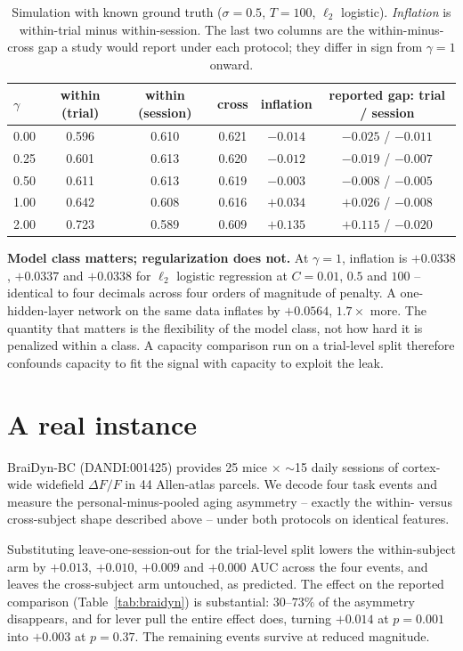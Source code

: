 \documentclass{article}
\newcommand{\auc}{\mathrm{AUC}}
\begin{document}
\begin{table}[t]\centering
\caption{Simulation with known ground truth ($\sigma = 0.5$, $T = 100$, $\ell_2$ logistic).
\emph{Inflation} is within-trial minus within-session. The last two columns are the within-minus-cross
gap a study would report under each protocol; they differ in sign from $\gamma = 1$ onward.}
\label{tab:sim}
\begin{tabular}{lccccc}
\toprule
$\gamma$ & within (trial) & within (session) & cross & inflation & reported gap: trial / session \\
\midrule
0.00 & 0.596 & 0.610 & 0.621 & $-0.014$ & $-0.025$ / $-0.011$ \\
0.25 & 0.601 & 0.613 & 0.620 & $-0.012$ & $-0.019$ / $-0.007$ \\
0.50 & 0.611 & 0.613 & 0.619 & $-0.003$ & $-0.008$ / $-0.005$ \\
1.00 & 0.642 & 0.608 & 0.616 & $\mathbf{+0.034}$ & $\mathbf{+0.026}$ / $\mathbf{-0.008}$ \\
2.00 & 0.723 & 0.589 & 0.609 & $\mathbf{+0.135}$ & $\mathbf{+0.115}$ / $\mathbf{-0.020}$ \\
\bottomrule
\end{tabular}
\end{table}

\textbf{Model class matters; regularization does not.} At $\gamma = 1$, inflation is $+0.0338$,
$+0.0337$ and $+0.0338$ for $\ell_2$ logistic regression at $C = 0.01$, $0.5$ and $100$ -- identical
to four decimals across four orders of magnitude of penalty. A one-hidden-layer network on the same
data inflates by $+0.0564$, $1.7\times$ more. The quantity that matters is the flexibility of the
model class, not how hard it is penalized within a class. A capacity comparison run on a trial-level
split therefore confounds capacity to fit the signal with capacity to exploit the leak.

\section{A real instance}
\label{sec:braidyn}
BraiDyn-BC \citep{kondo2025} (DANDI:001425) provides 25 mice $\times$ $\sim$15 daily sessions of
cortex-wide widefield $\Delta F/F$ in 44 Allen-atlas parcels. We decode four task events and measure
the personal-minus-pooled aging asymmetry -- exactly the within- versus cross-subject shape described
above -- under both protocols on identical features.

Substituting leave-one-session-out for the trial-level split lowers the within-subject arm by
$+0.013$, $+0.010$, $+0.009$ and $+0.000$ $\auc$ across the four events, and leaves the cross-subject
arm untouched, as predicted. The effect on the reported comparison (Table~\ref{tab:braidyn}) is
substantial: $30$--$73\%$ of the asymmetry disappears, and for lever pull the entire effect does,
turning $+0.014$ at $p = 0.001$ into $+0.003$ at $p = 0.37$. The remaining events survive at reduced
magnitude.
\end{document}
